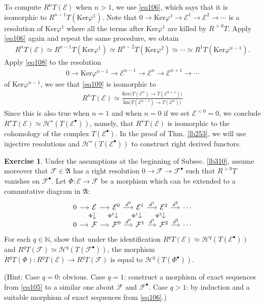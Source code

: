\documentclass[12pt,b5paper,notitlepage]{report}
\theoremstyle{definition}
\newtheorem{exe}[df]{Exercise}
\theoremstyle{plain}
\newcommand{\fk}{\mathfrak}
\newcommand{\mc}{\mathcal}
\newcommand{\blt}{\bullet}
\newcommand{\Nbb}{\mathbb N}
\newcommand{\Ker}{\mathrm{Ker}}
\newcommand{\Imag}{\mathrm{Im}}
\numberwithin{equation}{section}
\begin{document}
To compute $R^nT(\mc E)$ when $n>1$, we use \eqref{eq106}, which says that it is isomorphic to $R^{n-1}T(\Ker\varphi^1)$. Note that $0\rightarrow\Ker\varphi^1\rightarrow\mc E^1\rightarrow\mc E^2\rightarrow\cdots$ is a resolution of $\Ker\varphi^1$ where all the terms after $\Ker\varphi^1$ are killed by $R^{>0}T$. Apply \eqref{eq106} again and repeat the same procedure, we obtain
\begin{align}
R^nT(\mc E)\simeq R^{n-1}T(\Ker\varphi^1)\simeq R^{n-2}T(\Ker\varphi^2)\simeq\cdots\simeq R^1T(\Ker\varphi^{n-1}).\label{eq109}
\end{align}
Apply \eqref{eq108} to the resolution
\begin{align*}
0\rightarrow\Ker\varphi^{n-1}\rightarrow\mc E^{n-1}\rightarrow\mc E^n\rightarrow\mc E^{n+1}\rightarrow\cdots
\end{align*}
of $\Ker\varphi^{n-1}$, we see that \eqref{eq109} is isomorphic to
\begin{align}
R^nT(\mc E)\simeq \frac{\Ker\big(T(\mc E^n)\rightarrow T(\mc E^{n+1})\big)}{\Imag\big(T(\mc E^{n-1})\rightarrow T(\mc E^n)\big)}   \label{eq150}
\end{align}
Since this is also true when $n=1$ and when $n=0$ if we set $\mc E^{<0}=0$, we conclude {\color{red}$R^\star T(\mc E)\simeq\mc H^\star(T(\mc E^\blt))$}, namely, that $R^\star T(\mc E)$ is isomorphic to the cohomology of the complex $T(\mc E^\blt)$. In the proof of Thm. \ref{lb253}, we will use injective resolutions and $\mc H^\star(T(\mc E^\blt))$ to construct right derived functors.


\begin{exe}\label{lb328}
Under the assumptions at the beginning of Subsec. \ref{lb310}, assume moreover that $\mc F\in\fk A$ has a right resolution $0\rightarrow\mc F\rightarrow\mc F^\blt$ such that $R^{>0}T$ vanishes on $\mc F^\blt$. Let $\Phi:\mc E\rightarrow\mc F$ be a morphism which can be extended to a commutative diagram in $\fk A$:
\begin{equation*}
\begin{tikzcd}[sep=small]
0 \arrow[r] & \mc E \arrow[r] \arrow[d, "\Phi"'] & \mc E^0 \arrow[r,"d^0"] \arrow[d, "\Phi^0"'] & \mc E^1 \arrow[r,"d^1"] \arrow[d, "\Phi^1"'] & \mc E^2 \arrow[r,"d^2"] \arrow[d, "\Phi^2"'] & \cdots \\
0 \arrow[r] & \mc F \arrow[r]                       & \mc F^0 \arrow[r,"d^0"]                         & \mc F^1 \arrow[r,"d^1"]                         & \mc F^2 \arrow[r,"d^2"]                         & \cdots
\end{tikzcd}
\end{equation*}
For each $q\in\Nbb$, show that under the identification $R^q T(\mc E)\simeq\mc H^q(T(\mc E^\blt))$ and $R^q T(\mc F)\simeq\mc H^q(T(\mc F^\blt))$, the morphism $R^qT(\Phi):R^qT(\mc E)\rightarrow R^qT(\mc F)$ is equal to $\mc H^q(T(\Phi^\blt))$. 

(Hint: Case $q=0$: obvious. Case $q=1$: construct a morphism of exact sequences from \eqref{eq105} to a similar one about $\mc F$ and $\mc F^\blt$. Case $q>1$: by induction and a suitable morphism of exact sequences from \eqref{eq106}.)   \hfill\qedsymbol
\end{exe}
\end{document}
